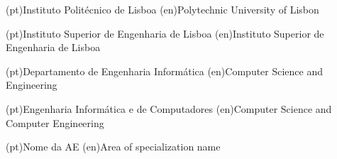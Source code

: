 
%



\ncuniversity*(pt){Instituto Politécnico de Lisboa}
\ncuniversity*(en){Polytechnic University of Lisbon}

\ncschool*(pt){Instituto Superior de Engenharia de Lisboa}
\ncschool*(en){Instituto Superior de Engenharia de Lisboa}

\ncdepartment*(pt){Departamento de Engenharia Informática}
\ncdepartment*(en){Computer Science and Engineering}


\ncmajorfield(pt){Engenharia Informática e de Computadores}
\ncmajorfield(en){Computer Science and Computer Engineering}




\ncspecialization(pt){Nome da AE}
\ncspecialization(en){Area of specialization name}
